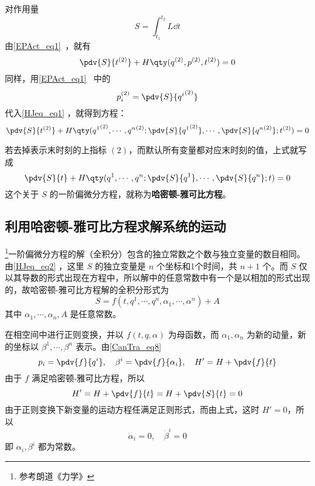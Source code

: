 
对作用量
\begin{equation}
S=\int_{t_1}^{t_2}L\dd t
\end{equation}
由\autoref{EPAct_eq1}~，就有
\begin{equation}\label{HJeq_eq1}
\pdv{S}{t^{(2)}}+H\qty(q^{(2)},p^{(2)},t^{(2)})=0
\end{equation}
同样，用\autoref{EPAct_eq1}~ 中的
\begin{equation}
p_i^{(2)}=\pdv{S}{{q^i}^{(2)}}
\end{equation}
代入\autoref{HJeq_eq1} ，就得到方程：
\begin{equation}
\pdv{S}{t^{(2)}}+H\qty({q^1}^{(2)},\cdots,{q^n}^{(2)};\pdv{S}{{q^1}^{(2)}},\cdots,\pdv{S}{{q^n}^{(2)}};t^{(2)})=0
\end{equation}

若去掉表示末时刻的上指标 $(2)$，而默认所有变量都对应末时刻的值，上式就写成
\begin{equation}\label{HJeq_eq2}
\pdv{S}{t}+H\qty({q^1},\cdots,{q^n};\pdv{S}{{q^1}},\cdots,\pdv{S}{{q^n}};t)=0
\end{equation}
这个关于 $S$ 的一阶偏微分方程，就称为\textbf{哈密顿-雅可比方程}。
\subsection{利用哈密顿-雅可比方程求解系统的运动}
\footnote{参考朗道《力学》}一阶偏微分方程的解（全积分）包含的独立常数之个数与独立变量的数目相同。由\autoref{HJeq_eq2} ，这里 $S$ 的独立变量是 $n$ 个坐标和1个时间，共 $n+1$ 个。而 $S$ 仅以其导数的形式出现在方程中，所以解中的任意常数中有一个是以相加的形式出现的，故哈密顿-雅可比方程解的全积分形式为
\begin{equation}
S=f(t,q^1,\cdots,q^n,\alpha_1,\cdots,\alpha^n)+A
\end{equation}
其中 $\alpha_1,\cdots,\alpha_n,A$ 是任意常数。

在相空间中进行正则变换，并以 $f(t,q,\alpha)$ 为母函数，而 $\alpha_1,\alpha_n$ 为新的动量，新的坐标以 $\beta^1,\cdots,\beta^n$ 表示。由\autoref{CanTra_eq8}~
\begin{equation}
p_i=\pdv{f}{q^i},\quad \beta^i=\pdv{f}{\alpha_i},\quad H'=H+\pdv{f}{t}
\end{equation}
由于 $f$ 满足哈密顿-雅可比方程，所以
\begin{equation}
H'=H+\pdv{f}{t}=H+\pdv{S}{t}=0
\end{equation}
由于正则变换下新变量的运动方程任满足正则形式，而由上式，这时 $H'=0$，所以
\begin{equation}
\dot\alpha_i=0,\quad\dot\beta^i=0
\end{equation}
即 $\alpha_i,\beta^i$ 都为常数。